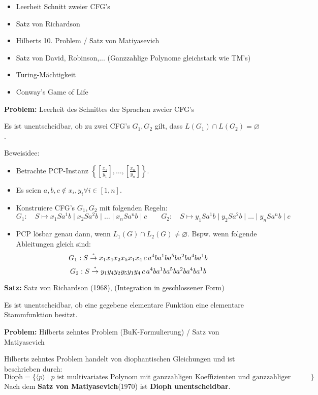 \documentclass[a4paper,graphics,11pt]{article}
\newcommand{\up}[2]{\mathrel{\overset{\makebox[0pt]{\mbox{\normalfont\tiny #2}}}{#1}}}
\newcommand{\godel}[1]{\langle #1 \rangle}
\begin{document}
\begin{itemize}
    \item Leerheit Schnitt zweier CFG's
    \item Satz von Richardson
    \item Hilberts 10. Problem / Satz von Matiyasevich
    \item Satz von David, Robinson,... (Ganzzahlige Polynome gleichstark wie TM's)
    \item Turing-Mächtigkeit
    \item Conway's Game of Life
\end{itemize}

\textbf{Problem:} Leerheit des Schnittes der Sprachen zweier CFG's

Es ist unentscheidbar, ob zu zwei CFG's $G_1,G_2$ gilt, dass $L(G_1) \cap L(G_2) = \varnothing$.

Beweisidee:
\begin{itemize}
    \item Betrachte PCP-Instanz
        $\displaystyle\left\{\left[\frac{x_1}{y_1}\right],\dots,\left[\frac{x_n}{y_n} \right]\right\}$.\\
    \item Es seien $a,b,c \notin x_i,y_i \forall i \in [1,n]$.
    \item Konstruiere CFG's $G_1,G_2$ mit folgenden Regeln:
        $$
            G_1:\quad S\mapsto x_1Sa^1b \mid x_2 Sa^2b \mid \dots \mid x_n Sa^nb \mid c
            \qquad
            G_2:\quad S\mapsto y_1Sa^1b \mid y_2 Sa^2b \mid \dots \mid y_n Sa^nb \mid c
        $$
    \item PCP lösbar genau dann, wenn $L_1(G) \cap L_2(G) \neq \varnothing$. Bspw.
        wenn folgende Ableitungen gleich sind:
        $$
            G_1 : S \up{\to}{*} x_1x_4x_2x_5x_1x_4\,c\,a^4ba^1ba^5ba^2ba^4ba^1b
        $$$$
            G_2 : S \up{\to}{*} y_1y_4y_2y_5y_1y_4\,c\,a^4ba^1ba^5ba^2ba^4ba^1b
        $$
\end{itemize}

\strut

\textbf{Satz:} Satz von Richardson (1968), (Integration in geschlossener Form)

Es ist unentscheidbar, ob eine gegebene elementare Funktion eine elementare Stammfunktion besitzt.

\strut

\textbf{Problem:} Hilberts zehntes Problem (BuK-Formulierung) / Satz von Matiyasevich

Hilberts zehntes Problem handelt von diophantischen Gleichungen und ist beschrieben durch:
$$
    \text{Dioph} =  \{\godel{p} \mid p \text{ ist multivariates Polynom mit ganzzahligen Koeffizienten und ganzzahliger Nullstelle}\}
$$
Nach dem \textbf{Satz von Matiyasevich}(1970) ist \textbf{Dioph unentscheidbar}.
\end{document}
